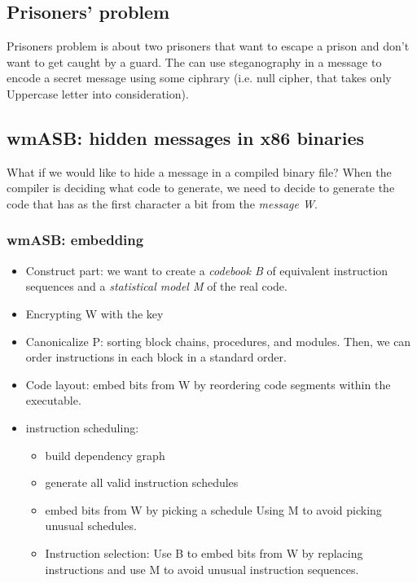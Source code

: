 \subsection{Prisoners' problem}

Prisoners problem is about two prisoners that want to escape a prison and don't want to get caught by a guard. The can use steganography in a message to encode a secret message using some ciphrary (i.e. null cipher, that takes only Uppercase letter into consideration).

\subsection{wmASB: hidden messages in x86 binaries}

What if we would like to hide a message in a compiled binary file? 
When the compiler is deciding what code to generate, we need to decide to generate the code that has as the first character a bit from the \textit{message W}. 

\subsubsection{wmASB: embedding}

\begin{itemize}
    \item Construct part: we want to create a \textit{codebook B} of equivalent instruction sequences and a \textit{statistical model M} of the real code.\newline
    \item Encrypting W with the key
    \item Canonicalize P: sorting block chains, procedures, and modules. 
    Then, we can order instructions in each block in a standard order. 
    \item Code layout: embed bits from W by reordering code segments within the executable.
    \item instruction scheduling:
    \begin{itemize}
        \item build dependency graph
        \item generate all valid instruction schedules
        \item embed bits from W by picking a schedule 
        Using M to avoid picking unusual schedules. 
    \item Instruction selection: 
    Use B to embed bits from W by replacing instructions and use M to avoid unusual instruction sequences. 
    \end{itemize}
\end{itemize}

